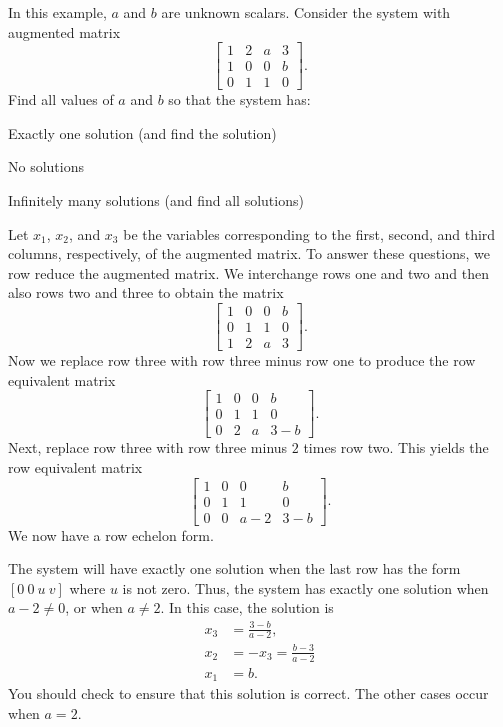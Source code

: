  \begin{example} In this example, $a$ and $b$ are unknown scalars. Consider the system with augmented matrix 
 \[\left[ \begin{array}{ccc|c} 1&2&a&3 \\ 1&0&0&b \\ 0&1&1&0 \end{array} \right].\] 
 Find all values of $a$ and $b$ so that the system has:
 	\ba
	\item Exactly one solution (and find the solution)
	\item No solutions
	\item Infinitely many solutions (and find all solutions)
	\ea

\ExampleSolution Let $x_1$, $x_2$, and $x_3$ be the variables corresponding to the first, second, and third columns, respectively, of the augmented matrix. To answer these questions, we row reduce the augmented matrix. We interchange rows one and two and then also rows two and three to obtain the matrix
\[\left[ \begin{array}{ccc|c} 1&0&0&b  \\ 0&1&1&0 \\ 1&2&a&3  \end{array} \right].\] 
Now we replace row three with row three minus row one to produce the row equivalent matrix 
\[\left[ \begin{array}{crc|r} 1&0&0&b  \\ 0&1&1&0 \\ 0&2&a&3-b  \end{array} \right].\] 
Next, replace row three with row three minus $2$ times row two. This yields the row equivalent matrix
\[\left[ \begin{array}{ccc|c} 1&0&0&b  \\ 0&1&1&0 \\ 0&0&a-2&3-b  \end{array} \right].\] 
We now have a row echelon form. 
\ba
\item The system will have exactly one solution when the last row has the form $[0 \ 0 \ u \ v]$ where $u$ is not zero. Thus, the system has exactly one solution when $a-2 \neq 0$, or when $a \neq 2$.  In this case, the solution is 
\begin{align*}
x_3 &= \frac{3-b}{a-2}, \\
x_2 &= -x_3 = \frac{b-3}{a-2} \\
x_1 &= b.
\end{align*}
You should check to ensure that this solution is correct. The other cases occur when $a = 2$. 

\end{example}
